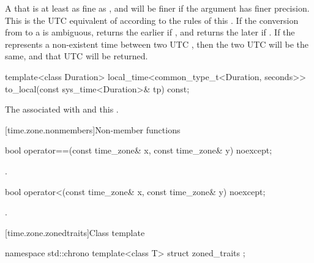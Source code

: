 \begin{itemdescr}
\pnum
\returns
A  that is at least as fine as ,
and will be finer if the argument  has finer precision.
This  is the UTC equivalent of 
according to the rules of this .
If the conversion from  to a  is ambiguous,
returns the earlier  if , and
returns the later  if .
If the  represents a non-existent time between two UTC ,
then the two UTC  will be the same,
and that UTC  will be returned.
\end{itemdescr}

%
\begin{itemdecl}
template<class Duration>
  local_time<common_type_t<Duration, seconds>>
    to_local(const sys_time<Duration>& tp) const;
\end{itemdecl}

\begin{itemdescr}
\pnum
\returns
The  associated with  and this .
\end{itemdescr}

[time.zone.nonmembers]{Non-member functions}

%
\begin{itemdecl}
bool operator==(const time_zone& x, const time_zone& y) noexcept;
\end{itemdecl}

\begin{itemdescr}
\pnum
\returns {}.
\end{itemdescr}

%
\begin{itemdecl}
bool operator<(const time_zone& x, const time_zone& y) noexcept;
\end{itemdecl}

\begin{itemdescr}
\pnum
\returns {}.
\end{itemdescr}

[time.zone.zonedtraits]{Class template }

\begin{codeblock}
namespace std::chrono {
  template<class T> struct zoned_traits {};
}
\end{codeblock}

